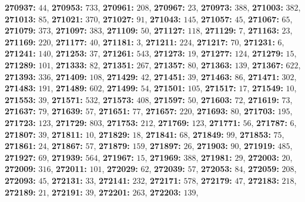 \textsf{\bfseries 270937:} $44$, \textsf{\bfseries 270953:} $733$, \textsf{\bfseries 270961:} $208$, \textsf{\bfseries 270967:} $23$, \textsf{\bfseries 270973:} $388$, \textsf{\bfseries 271003:} $382$, \textsf{\bfseries 271013:} $85$, \textsf{\bfseries 271021:} $370$, \textsf{\bfseries 271027:} $91$, \textsf{\bfseries 271043:} $145$, \textsf{\bfseries 271057:} $45$, \textsf{\bfseries 271067:} $65$, \textsf{\bfseries 271079:} $373$, \textsf{\bfseries 271097:} $383$, \textsf{\bfseries 271109:} $50$, \textsf{\bfseries 271127:} $118$, \textsf{\bfseries 271129:} $7$, \textsf{\bfseries 271163:} $23$, \textsf{\bfseries 271169:} $220$, \textsf{\bfseries 271177:} $40$, \textsf{\bfseries 271181:} $3$, \textsf{\bfseries 271211:} $224$, \textsf{\bfseries 271217:} $70$, \textsf{\bfseries 271231:} $6$, \textsf{\bfseries 271241:} $140$, \textsf{\bfseries 271253:} $37$, \textsf{\bfseries 271261:} $543$, \textsf{\bfseries 271273:} $19$, \textsf{\bfseries 271277:} $124$, \textsf{\bfseries 271279:} $15$, \textsf{\bfseries 271289:} $101$, \textsf{\bfseries 271333:} $82$, \textsf{\bfseries 271351:} $267$, \textsf{\bfseries 271357:} $80$, \textsf{\bfseries 271363:} $139$, \textsf{\bfseries 271367:} $622$, \textsf{\bfseries 271393:} $336$, \textsf{\bfseries 271409:} $108$, \textsf{\bfseries 271429:} $42$, \textsf{\bfseries 271451:} $39$, \textsf{\bfseries 271463:} $86$, \textsf{\bfseries 271471:} $302$, \textsf{\bfseries 271483:} $191$, \textsf{\bfseries 271489:} $602$, \textsf{\bfseries 271499:} $54$, \textsf{\bfseries 271501:} $105$, \textsf{\bfseries 271517:} $17$, \textsf{\bfseries 271549:} $10$, \textsf{\bfseries 271553:} $39$, \textsf{\bfseries 271571:} $532$, \textsf{\bfseries 271573:} $408$, \textsf{\bfseries 271597:} $50$, \textsf{\bfseries 271603:} $72$, \textsf{\bfseries 271619:} $73$, \textsf{\bfseries 271637:} $79$, \textsf{\bfseries 271639:} $57$, \textsf{\bfseries 271651:} $77$, \textsf{\bfseries 271657:} $220$, \textsf{\bfseries 271693:} $80$, \textsf{\bfseries 271703:} $195$, \textsf{\bfseries 271723:} $123$, \textsf{\bfseries 271729:} $803$, \textsf{\bfseries 271753:} $212$, \textsf{\bfseries 271769:} $123$, \textsf{\bfseries 271771:} $56$, \textsf{\bfseries 271787:} $6$, \textsf{\bfseries 271807:} $39$, \textsf{\bfseries 271811:} $10$, \textsf{\bfseries 271829:} $18$, \textsf{\bfseries 271841:} $68$, \textsf{\bfseries 271849:} $99$, \textsf{\bfseries 271853:} $75$, \textsf{\bfseries 271861:} $24$, \textsf{\bfseries 271867:} $57$, \textsf{\bfseries 271879:} $159$, \textsf{\bfseries 271897:} $26$, \textsf{\bfseries 271903:} $90$, \textsf{\bfseries 271919:} $485$, \textsf{\bfseries 271927:} $69$, \textsf{\bfseries 271939:} $564$, \textsf{\bfseries 271967:} $15$, \textsf{\bfseries 271969:} $388$, \textsf{\bfseries 271981:} $29$, \textsf{\bfseries 272003:} $20$, \textsf{\bfseries 272009:} $316$, \textsf{\bfseries 272011:} $101$, \textsf{\bfseries 272029:} $62$, \textsf{\bfseries 272039:} $57$, \textsf{\bfseries 272053:} $84$, \textsf{\bfseries 272059:} $208$, \textsf{\bfseries 272093:} $45$, \textsf{\bfseries 272131:} $33$, \textsf{\bfseries 272141:} $232$, \textsf{\bfseries 272171:} $578$, \textsf{\bfseries 272179:} $47$, \textsf{\bfseries 272183:} $218$, \textsf{\bfseries 272189:} $21$, \textsf{\bfseries 272191:} $39$, \textsf{\bfseries 272201:} $263$, \textsf{\bfseries 272203:} $139$, 
